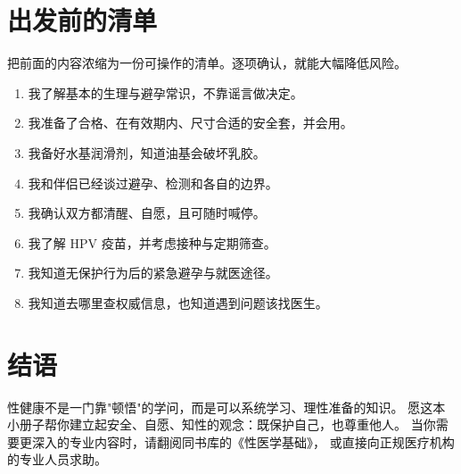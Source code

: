 \chapter{出发前的清单}

把前面的内容浓缩为一份可操作的清单。逐项确认，就能大幅降低风险。

\begin{enumerate}[leftmargin=2em,itemsep=0.4em]
  \item 我了解基本的生理与避孕常识，不靠谣言做决定。
  \item 我准备了合格、在有效期内、尺寸合适的安全套，并会用。
  \item 我备好水基润滑剂，知道油基会破坏乳胶。
  \item 我和伴侣已经谈过避孕、检测和各自的边界。
  \item 我确认双方都清醒、自愿，且可随时喊停。
  \item 我了解 HPV 疫苗，并考虑接种与定期筛查。
  \item 我知道无保护行为后的紧急避孕与就医途径。
  \item 我知道去哪里查权威信息，也知道遇到问题该找医生。
\end{enumerate}

\chapter*{结语}

性健康不是一门靠"顿悟"的学问，而是可以系统学习、理性准备的知识。
愿这本小册子帮你建立起安全、自愿、知性的观念：既保护自己，也尊重他人。
当你需要更深入的专业内容时，请翻阅同书库的《性医学基础》，
或直接向正规医疗机构的专业人员求助。

\vspace{2em}

